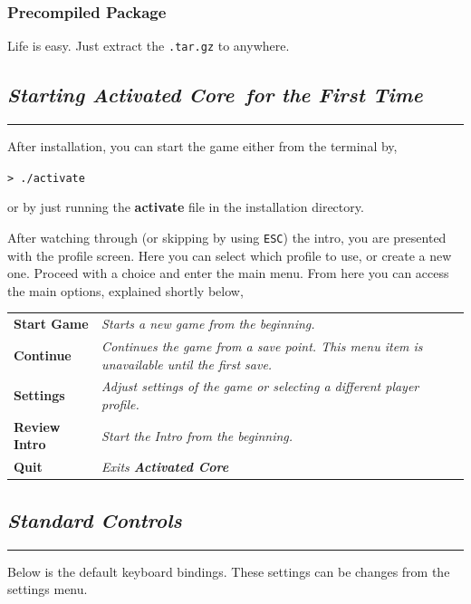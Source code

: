 \documentclass[a5paper, 10pt, titlepage, landscape, twoside, final]{article}
\newcommand{\ac}{\textbf{Activated Core}}
\begin{document}
\subsubsection{Precompiled Package}
Life is easy. Just extract the \texttt{.tar.gz} to anywhere. 


\clearpage
\begin{center}
\subsection{\textit{Starting \ac\ for the First Time}}
\end{center}
\hrule\par
%
After installation, you can start the game either from the terminal by,
\par
\texttt{> ./activate}
\par
or by just running the \textbf{activate} file in the installation directory.

After watching through (or skipping by using \texttt{ESC}) the intro, you are presented with the profile screen. Here you can select which profile to use, or create a new one. Proceed with a choice and enter the main menu. From here you can access the main options, explained shortly below,

\begin{table}[ht]
  \begin{tabular}{ll}
    \textbf{Start Game} & \textit{Starts a new game from the beginning.} \\
    \textbf{Continue} & \textit{Continues the game from a save point. This menu item is unavailable until the first save.} \\
    \textbf{Settings} & \textit{Adjust settings of the game or selecting a different player profile.} \\
    \textbf{Review Intro} & \textit{Start the Intro from the beginning.} \\
    \textbf{Quit} & \textit{Exits \ac}
  \end{tabular}
\end{table}


\clearpage
\begin{center}
\subsection{\textit{Standard Controls}}
\end{center}
\hrule\par
%
Below is the default keyboard bindings. These settings can be changes from the settings menu.
\end{document}
